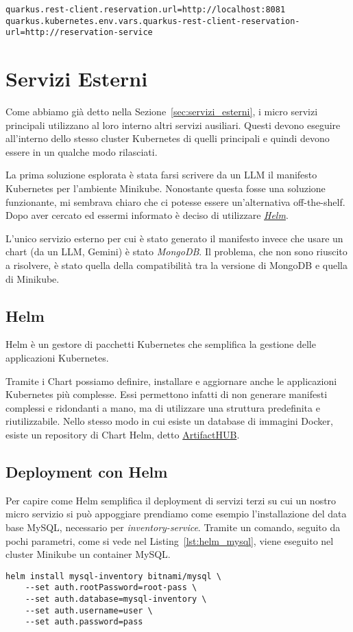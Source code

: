 \begin{lstlisting}[caption=Reference in different environments, label=lst:reference]
quarkus.rest-client.reservation.url=http://localhost:8081
quarkus.kubernetes.env.vars.quarkus-rest-client-reservation-url=http://reservation-service
\end{lstlisting}

\section{Servizi Esterni}
Come abbiamo già detto nella Sezione~\ref{sec:servizi_esterni}, i micro servizi principali utilizzano al loro interno altri servizi ausiliari. Questi devono eseguire all'interno dello stesso cluster Kubernetes di quelli principali e quindi devono essere in un qualche modo rilasciati.

La prima soluzione esplorata è stata farsi scrivere da un LLM il manifesto Kubernetes per l'ambiente Minikube. Nonostante questa fosse una soluzione funzionante, mi sembrava chiaro che ci potesse essere un'alternativa off-the-shelf. Dopo aver cercato ed essermi informato è deciso di utilizzare \href{https://helm.sh}{\textit{Helm}}.

\myskip

L'unico servizio esterno per cui è stato generato il manifesto invece che usare un chart (da un LLM, Gemini) è stato \textit{MongoDB}. Il problema, che non sono riuscito a risolvere, è stato quella della compatibilità tra la versione di MongoDB e quella di Minikube.

\subsection{Helm}
Helm è un gestore di pacchetti Kubernetes che semplifica la gestione delle applicazioni Kubernetes.

Tramite i Chart possiamo definire, installare e aggiornare anche le applicazioni Kubernetes più complesse. Essi permettono infatti di non generare manifesti complessi e ridondanti a mano, ma di utilizzare una struttura predefinita e riutilizzabile. Nello stesso modo in cui esiste un database di immagini Docker, esiste un repository di Chart Helm, detto \href{https://artifacthub.io/}{ArtifactHUB}.

\subsection{Deployment con Helm}
Per capire come Helm semplifica il deployment di servizi terzi su cui un nostro micro servizio si può appoggiare prendiamo come esempio l'installazione del data base MySQL, necessario per \textit{inventory-service}. Tramite un comando, seguito da pochi parametri, come si vede nel Listing~\ref{lst:helm_mysql}, viene eseguito nel cluster Minikube un container MySQL.
\begin{lstlisting}[caption=MySQL Helm chart, label=lst:helm_mysql]
helm install mysql-inventory bitnami/mysql \
    --set auth.rootPassword=root-pass \
    --set auth.database=mysql-inventory \
    --set auth.username=user \
    --set auth.password=pass
\end{lstlisting}